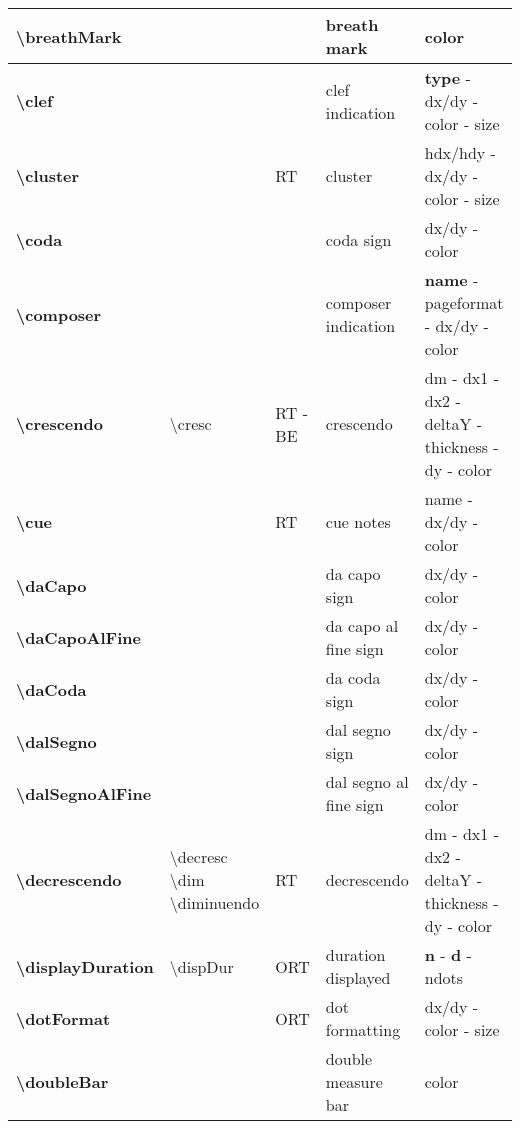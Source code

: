 \documentclass[a4paper, landscape, 10pt]{article}
\begin{document}
\begin{tabularx}{\linewidth}{p{3cm}p{4.5cm}p{3cm}p{5.5cm}l}
    \hline
    \textbf{\textbackslash{}breathMark}&&&breath mark&color\\
    \hline
    \textbf{\textbackslash{}clef}&&&clef indication&\textbf{type} - dx/dy - color - size\\
    \hline
    \textbf{\textbackslash{}cluster}&&RT&cluster&hdx/hdy - dx/dy - color - size\\
    \hline
    \textbf{\textbackslash{}coda}&&&coda sign&dx/dy - color\\
    \hline
    \textbf{\textbackslash{}composer}&&&composer indication&\textbf{name} - pageformat - dx/dy - color\\
    \hline
    \textbf{\textbackslash{}crescendo}&\textbackslash{}cresc&RT - BE&crescendo&dm - dx1 - dx2 - deltaY - thickness - dy - color\\
    \hline
	\textbf{\textbackslash{}cue}&&RT&cue notes&name - dx/dy - color\\
    \hline
    \textbf{\textbackslash{}daCapo}&&&da capo sign&dx/dy - color\\
    \hline
    \textbf{\textbackslash{}daCapoAlFine}&&&da capo al fine sign&dx/dy - color\\
    \hline
    \textbf{\textbackslash{}daCoda}&&&da coda sign&dx/dy - color\\
    \hline
    \textbf{\textbackslash{}dalSegno}&&&dal segno sign&dx/dy - color\\
    \hline
    \textbf{\textbackslash{}dalSegnoAlFine}&&&dal segno al fine sign&dx/dy - color\\
    \hline
    \textbf{\textbackslash{}decrescendo}&\textbackslash{}decresc \textbackslash{}dim \textbackslash{}diminuendo&RT&decrescendo&dm - dx1 - dx2 - deltaY - thickness - dy - color\\
    \hline
    \textbf{\textbackslash{}displayDuration}&\textbackslash{}dispDur&ORT&duration displayed&\textbf{n} - \textbf{d} - ndots\\
    \hline
    \textbf{\textbackslash{}dotFormat}&&ORT&dot formatting&dx/dy - color - size\\
    \hline
    \textbf{\textbackslash{}doubleBar}&&&double measure bar&color\\
    \hline

\end{tabularx}
\end{document}
